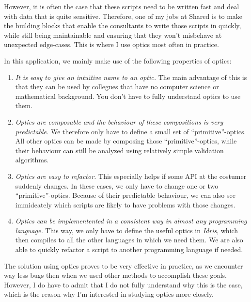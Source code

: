 \documentclass{article}
\begin{document}
However, it is often the case that these scripts need to be written fast and deal with data that is quite sensitive. Therefore, one of my jobs at Shared is to make the building blocks that enable the consultants to write those scripts in quickly, while still being maintainable and ensuring that they won't misbehave at unexpected edge-cases. This is where I use optics most often in practice.

\medskip

In this application, we mainly make use of the following properties of optics:
\begin{enumerate}
  \item \emph{It is easy to give an intuïtive name to an optic.} The main advantage of this is that they can be used by collegues that have no computer science or mathematical background. You don't have to fully understand optics to use them.
  \item \emph{Optics are composable and the behaviour of these compositions is very predictable.} We therefore only have to define a small set of ``primitive''-optics. All other optics can be made by composing those ``primitive''-optics, while their behaviour can still be analyzed using relatively simple validation algorithms.
  \item \emph{Optics are easy to refactor.} This especially helps if some API at the costumer suddenly changes. In these cases, we only have to change one or two ``primitive''-optics. Because of their predictable behaviour, we can also see immideately which scripts are likely to have problems with those changes.
  \item \emph{Optics can be implementented in a consistent way in almost any programming language.} This way, we only have to define the useful optics in \emph{Idris}, which then compiles to all the other languages in which we need them. We are also able to quickly refactor a script to another programming language if needed.
\end{enumerate}

The solution using optics proves to be very effective in practice, as we encounter way less bugs then when we used other methods to accomplish these goals. However, I do have to admit that I do not fully understand why this is the case, which is the reason why I'm interested in studying optics more closely.
\end{document}
